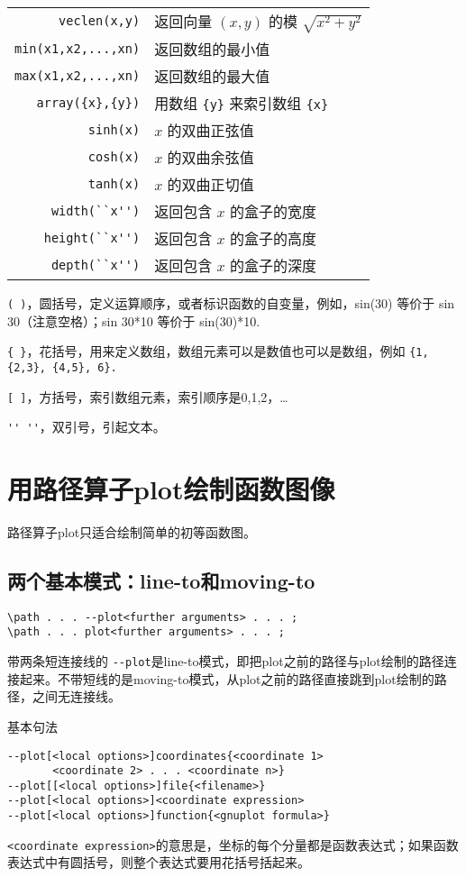\documentclass[UTF8]{ctexart}
\begin{document}
\begin{longtable}{r|l}
\verb=veclen(x,y)= & 返回向量 $(x,y)$ 的模 $\sqrt{x^2+y^2}$\\
\verb=min(x1,x2,...,xn)= & 返回数组的最小值\\
\verb=max(x1,x2,...,xn)= & 返回数组的最大值\\
\verb=array({x},{y})= & 用数组 \verb!{y}! 来索引数组 \verb!{x}!\\
\verb=sinh(x)= & $x$ 的双曲正弦值\\
\verb=cosh(x)= & $x$ 的双曲余弦值\\
\verb=tanh(x)= & $x$ 的双曲正切值\\
\verb=width(``x'')= & 返回包含 $x$ 的盒子的宽度\\
\verb=height(``x'')= & 返回包含 $x$ 的盒子的高度\\
\verb=depth(``x'')= & 返回包含 $x$ 的盒子的深度\\
\end{longtable}

\verb!( )!，圆括号，定义运算顺序，或者标识函数的自变量，例如，sin(30) 等价于 sin 30（注意空格）；sin 30*10 等价于 sin(30)*10.

\verb!{ }!，花括号，用来定义数组，数组元素可以是数值也可以是数组，例如 \verb!{1, {2,3}, {4,5}, 6}.!

\verb![ ]!，方括号，索引数组元素，索引顺序是0,1,2，…

\verb!'' ''!，双引号，引起文本。




\section{用路径算子plot绘制函数图像}

路径算子plot只适合绘制简单的初等函数图。

\subsection{两个基本模式：line-to和moving-to}

\begin{lstlisting}[showspaces=true]
\path . . . --plot<further arguments> . . . ;
\path . . . plot<further arguments> . . . ;
\end{lstlisting}
带两条短连接线的 \verb!--plot!是line-to模式，即把plot之前的路径与plot绘制的路径连接起来。不带短线的是moving-to模式，从plot之前的路径直接跳到plot绘制的路径，之间无连接线。

{ \kaishu  \color{red}  基本句法 }
\begin{lstlisting}[showspaces=true]
--plot[<local options>]coordinates{<coordinate 1> 
       <coordinate 2> . . . <coordinate n>}
--plot[[<local options>]file{<filename>}
--plot[<local options>]<coordinate expression>
--plot[<local options>]function{<gnuplot formula>}
\end{lstlisting}
\verb!<coordinate expression>!的意思是，坐标的每个分量都是函数表达式；如果函数表达式中有圆括号，则整个表达式要用花括号括起来。
\end{document}
